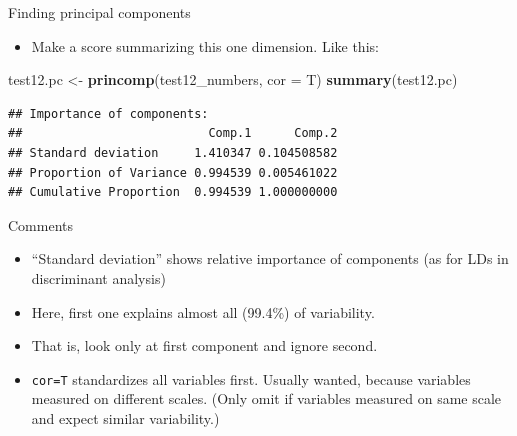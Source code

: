 \documentclass[ignorenonframetext,]{beamer}
\newenvironment{Shaded}{\begin{snugshade}}{\end{snugshade}}
\newcommand{\DataTypeTok}[1]{\textcolor[rgb]{0.13,0.29,0.53}{#1}}
\newcommand{\KeywordTok}[1]{\textcolor[rgb]{0.13,0.29,0.53}{\textbf{#1}}}
\newcommand{\NormalTok}[1]{#1}
\newcommand{\StringTok}[1]{\textcolor[rgb]{0.31,0.60,0.02}{#1}}
\providecommand{\tightlist}{%
  \setlength{\itemsep}{0pt}\setlength{\parskip}{0pt}}
\begin{document}
\begin{frame}[fragile]{Finding principal components}
\protect\hypertarget{finding-principal-components}{}

\begin{itemize}
\tightlist
\item
  Make a score summarizing this one dimension. Like this:
\end{itemize}

\begin{Shaded}
\begin{Highlighting}[]
\NormalTok{test12.pc <-}\StringTok{ }\KeywordTok{princomp}\NormalTok{(test12_numbers, }\DataTypeTok{cor =}\NormalTok{ T)}
\KeywordTok{summary}\NormalTok{(test12.pc)}
\end{Highlighting}
\end{Shaded}

\begin{verbatim}
## Importance of components:
##                          Comp.1      Comp.2
## Standard deviation     1.410347 0.104508582
## Proportion of Variance 0.994539 0.005461022
## Cumulative Proportion  0.994539 1.000000000
\end{verbatim}

\end{frame}

\begin{frame}[fragile]{Comments}
\protect\hypertarget{comments-27}{}

\begin{itemize}
\item
  ``Standard deviation'' shows relative importance of components (as for
  LDs in discriminant analysis)
\item
  Here, first one explains almost all (99.4\%) of variability.
\item
  That is, look only at first component and ignore second.
\item
  \texttt{cor=T} standardizes all variables first. Usually wanted,
  because variables measured on different scales. (Only omit if
  variables measured on same scale and expect similar variability.)
\end{itemize}

\end{frame}
\end{document}
